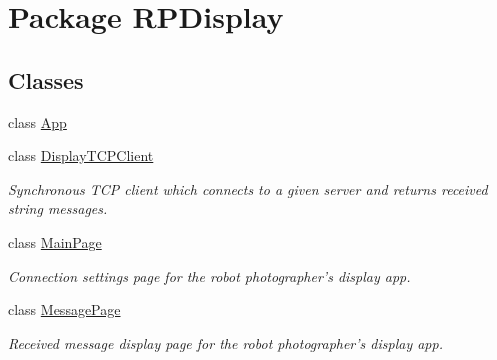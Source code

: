 \hypertarget{namespace_r_p_display}{\section{\-Package \-R\-P\-Display}
\label{namespace_r_p_display}
}
\subsection*{\-Classes}
\begin{DoxyCompactItemize}
\item 
class \hyperlink{class_r_p_display_1_1_app}{\-App}
\item 
class \hyperlink{class_r_p_display_1_1_display_t_c_p_client}{\-Display\-T\-C\-P\-Client}
\begin{DoxyCompactList}\small\item\em \-Synchronous \-T\-C\-P client which connects to a given server and returns received string messages. \end{DoxyCompactList}\item 
class \hyperlink{class_r_p_display_1_1_main_page}{\-Main\-Page}
\begin{DoxyCompactList}\small\item\em \-Connection settings page for the robot photographer's display app. \end{DoxyCompactList}\item 
class \hyperlink{class_r_p_display_1_1_message_page}{\-Message\-Page}
\begin{DoxyCompactList}\small\item\em \-Received message display page for the robot photographer's display app. \end{DoxyCompactList}\end{DoxyCompactItemize}
